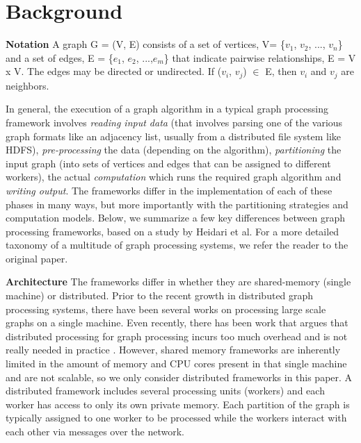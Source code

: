 \section{Background}
\label{sec:background}

\textbf{Notation} A graph G = (V, E) consists of a set of vertices, 
V= \{$v_1$, $v_2$, ..., $v_n$\} and a set of edges, E = \{$e_1$, $e_2$, ...,$e_m$\} that 
indicate pairwise relationships, E = V x V. The edges may be directed or undirected. 
If ($v_i$, $v_j$) $\in$ E, then $v_i$ and $v_j$ are neighbors.

In general, the execution of a graph algorithm in a typical graph processing framework
involves \textit{reading input data} (that involves parsing one of the various 
graph formats 
like an adjacency list, usually from a distributed file system like HDFS), 
\textit{pre-processing} the data (depending on the algorithm), \textit{partitioning} 
the input graph (into sets of vertices and edges that can be assigned to different workers),
the actual \textit{computation} which runs the required graph algorithm and 
\textit{writing output}. The frameworks differ in the implementation of each of these phases
in many ways, but more importantly with the partitioning strategies and computation models. 
Below, we summarize a few key differences between graph processing frameworks, 
based on a study by Heidari et al\cite{Heidari:2018:SGP:3212709.3199523}. 
For a more detailed taxonomy of a multitude of 
graph processing systems, we refer the reader to the original paper.

\textbf{Architecture}
The frameworks differ in whether they are shared-memory (single machine) or distributed. 
Prior to the recent growth in distributed graph processing systems, there have been 
several works on processing large scale graphs on a single machine. Even recently, there has been
work that argues that distributed processing for graph processing incurs too 
much overhead and is
not really needed in practice \cite{McSherry:2015:SBC:2831090.2831104}. However, shared memory 
frameworks are inherently limited in the amount of memory and CPU cores present in that single 
machine and are not scalable, so we only consider distributed frameworks in this paper.
A distributed framework includes several processing units (workers) and
each worker has access to only its own private memory. Each partition of the graph is typically 
assigned to one worker to be processed while the workers interact with each 
other via messages over the network. 

